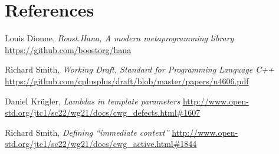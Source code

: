 \documentclass[11pt]{article}
\begin{document}
\section{References}
\renewcommand{\section}[2]{}%
\begin{thebibliography}{9}

    Louis Dionne,
    \emph{Boost.Hana, A modern metaprogramming library}\newline
    \url{https://github.com/boostorg/hana}

    Richard Smith,
    \emph{Working Draft, Standard for Programming Language C++}\newline
    \url{https://github.com/cplusplus/draft/blob/master/papers/n4606.pdf}

    Daniel Kr{\"u}gler,
    \emph{Lambdas in template parameters}\newline
    \url{http://www.open-std.org/jtc1/sc22/wg21/docs/cwg_defects.html#1607}

    Richard Smith,
    \emph{Defining “immediate context”}\newline
    \url{http://www.open-std.org/jtc1/sc22/wg21/docs/cwg_active.html#1844}

\end{thebibliography}
\end{document}
